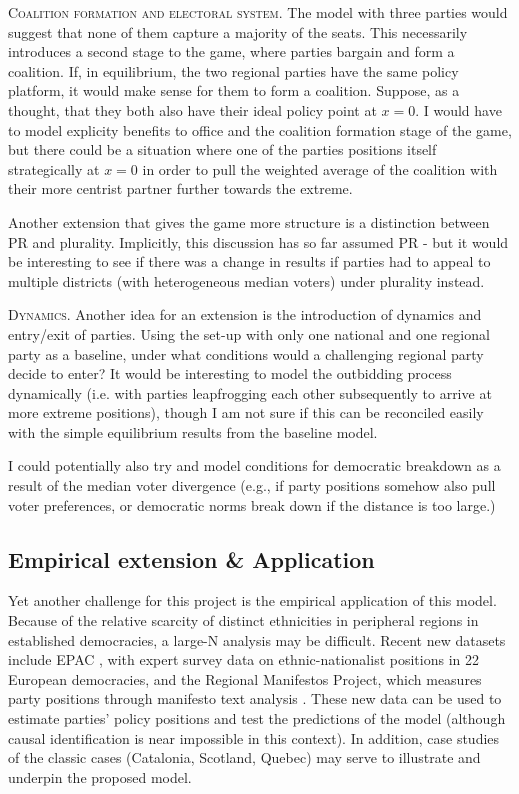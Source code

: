 \documentclass[11pt]{article}
\begin{document}
\textsc{Coalition formation and electoral system.} The model with three parties would suggest that none of them capture a majority of the seats. This necessarily introduces a second stage to the game, where parties bargain and form a coalition. If, in equilibrium, the two regional parties have the same policy platform, it would make sense for them to form a coalition. Suppose, as a thought, that they both also have their ideal policy point at $x = 0$. I would have to model explicity benefits to office and the coalition formation stage of the game, but there could be a situation where one of the parties positions itself strategically at $x = 0$ in order to pull the weighted average of the coalition with their more centrist partner further towards the extreme.

Another extension that gives the game more structure is a distinction between PR and plurality. Implicitly, this discussion has so far assumed PR - but it would be interesting to see if there was a change in results if parties had to appeal to multiple districts (with heterogeneous median voters) under plurality instead.

\textsc{Dynamics.} Another idea for an extension is the introduction of dynamics and entry/exit of parties. Using the set-up with only one national and one regional party as a baseline, under what conditions would a challenging regional party decide to enter? It would be interesting to model the outbidding process dynamically (i.e. with parties leapfrogging each other subsequently to arrive at more extreme positions), though I am not sure if this can be reconciled easily with the simple equilibrium results from the baseline model. 

I could potentially also try and model conditions for democratic breakdown as a result of the median voter divergence (e.g., if party positions somehow also pull voter preferences, or democratic norms break down if the distance is too large.)

\subsection{Empirical extension \& Application}

Yet another challenge for this project is the empirical application of this model. Because of the relative scarcity of distinct ethnicities in peripheral regions in established democracies, a large-N analysis may be difficult. Recent new datasets include EPAC \parencite{Szocsik2015}, with expert survey data on ethnic-nationalist positions in 22 European democracies, and the Regional Manifestos Project, which measures party positions through manifesto text analysis \parencite{Alonso2013}. These new data can be used to estimate parties' policy positions and test the predictions of the model (although causal identification is near impossible in this context). In addition, case studies of the classic cases (Catalonia, Scotland, Quebec) may serve to illustrate and underpin the proposed model.
\end{document}

